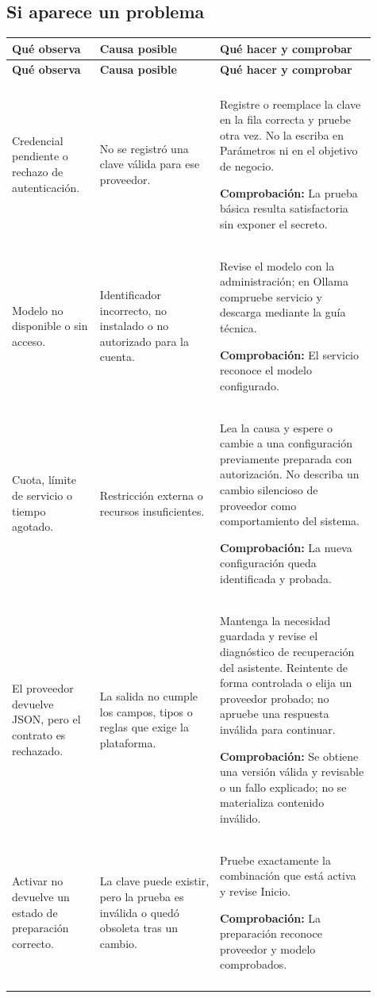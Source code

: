 \subsection{Si aparece un problema}
\begingroup
\fontsize{10}{12.5}\selectfont
\setlength{\tabcolsep}{5pt}
\renewcommand{\arraystretch}{1.15}
\begin{longtable}{@{}>{\RaggedRight\arraybackslash}p{0.22\linewidth}>{\RaggedRight\arraybackslash}p{0.3\linewidth}>{\RaggedRight\arraybackslash}p{0.39\linewidth}@{}}
\toprule
\textbf{Qué observa} & \textbf{Causa posible} & \textbf{Qué hacer y comprobar} \\
\midrule
\endfirsthead
\toprule
\textbf{Qué observa} & \textbf{Causa posible} & \textbf{Qué hacer y comprobar} \\
\midrule
\endhead
\midrule
\multicolumn{3}{r}{\footnotesize Continúa en la página siguiente}\\
\endfoot
\bottomrule
\endlastfoot
Credencial pendiente o rechazo de autenticación. & No se registró una clave válida para ese proveedor. & Registre o reemplace la clave en la fila correcta y pruebe otra vez. No la escriba en Parámetros ni en el objetivo de negocio.\par\smallskip\textbf{Comprobación:} La prueba básica resulta satisfactoria sin exponer el secreto. \\
\addlinespace[3pt]
Modelo no disponible o sin acceso. & Identificador incorrecto, no instalado o no autorizado para la cuenta. & Revise el modelo con la administración; en Ollama compruebe servicio y descarga mediante la guía técnica.\par\smallskip\textbf{Comprobación:} El servicio reconoce el modelo configurado. \\
\addlinespace[3pt]
Cuota, límite de servicio o tiempo agotado. & Restricción externa o recursos insuficientes. & Lea la causa y espere o cambie a una configuración previamente preparada con autorización. No describa un cambio silencioso de proveedor como comportamiento del sistema.\par\smallskip\textbf{Comprobación:} La nueva configuración queda identificada y probada. \\
\addlinespace[3pt]
El proveedor devuelve JSON, pero el contrato es rechazado. & La salida no cumple los campos, tipos o reglas que exige la plataforma. & Mantenga la necesidad guardada y revise el diagnóstico de recuperación del asistente. Reintente de forma controlada o elija un proveedor probado; no apruebe una respuesta inválida para continuar.\par\smallskip\textbf{Comprobación:} Se obtiene una versión válida y revisable o un fallo explicado; no se materializa contenido inválido. \\
\addlinespace[3pt]
Activar no devuelve un estado de preparación correcto. & La clave puede existir, pero la prueba es inválida o quedó obsoleta tras un cambio. & Pruebe exactamente la combinación que está activa y revise Inicio.\par\smallskip\textbf{Comprobación:} La preparación reconoce proveedor y modelo comprobados. \\
\addlinespace[3pt]
\end{longtable}
\endgroup

